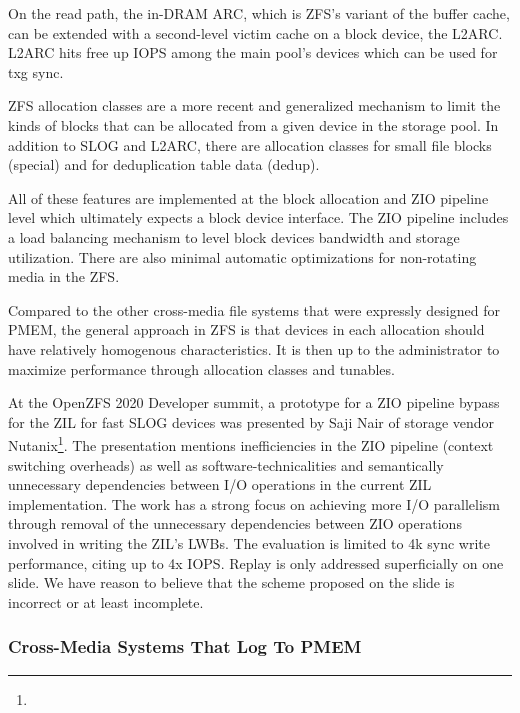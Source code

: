 \documentclass[12pt,a4paper,twoside,draft]{book}
\begin{document}
On the read path, the in-DRAM ARC, which is ZFS’s variant of the buffer cache, can be extended with a second-level victim cache on a block device, the L2ARC. L2ARC hits free up IOPS among the main pool’s devices which can be used for txg sync.

ZFS allocation classes are a more recent and generalized mechanism to limit the kinds of blocks that can be allocated from a given device in the storage pool. In addition to SLOG and L2ARC, there are allocation classes for small file blocks (special) and for deduplication table data (dedup).

All of these features are implemented at the block allocation and ZIO pipeline level which ultimately expects a block device interface. The ZIO pipeline includes a load balancing mechanism to level block devices bandwidth and storage utilization. There are also minimal automatic optimizations for non-rotating media in the ZFS.

Compared to the other cross-media file systems that were expressly designed for PMEM, the general approach in ZFS is that devices in each allocation should have relatively homogenous characteristics. It is then up to the administrator to maximize performance through allocation classes and tunables.

At the OpenZFS 2020 Developer summit, a prototype for a ZIO pipeline bypass for the ZIL for fast SLOG devices was presented by Saji Nair of storage vendor Nutanix\footnote{
}.
The presentation mentions inefficiencies in the ZIO pipeline (context switching overheads) as well as software-technicalities and semantically unnecessary dependencies between I/O operations in the current ZIL implementation. The work has a strong focus on achieving more I/O parallelism through removal of the unnecessary dependencies between ZIO operations involved in writing the ZIL’s LWBs. The evaluation is limited to 4k sync write performance, citing up to 4x IOPS. Replay is only addressed superficially on one slide. We have reason to believe that the scheme proposed on the slide is incorrect or at least incomplete.

\subsubsection{Cross-Media Systems That Log To PMEM}
\end{document}
